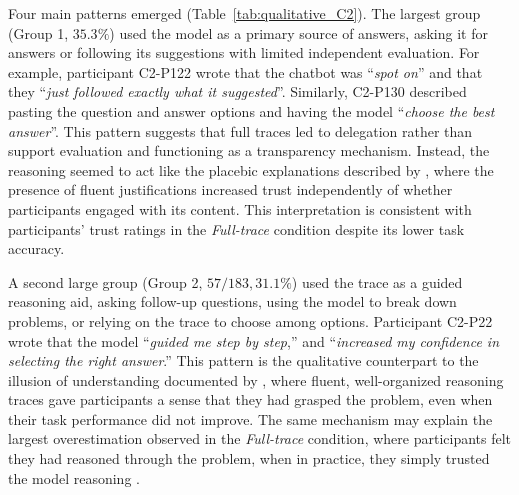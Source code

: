 \documentclass[acmlarge,review=true, anonymous=true]{acmart}
\begin{document}
Four main patterns emerged (Table~\ref{tab:qualitative_C2}). The largest group (Group 1, $35.3\%$) used the model as a primary source of answers, asking it for answers or following its suggestions with limited independent evaluation. For example, participant C2-P122 wrote that the chatbot was ``\textit{spot on}'' and that they ``\textit{just followed exactly what it suggested}''. Similarly, C2-P130 described pasting the question and answer options and having the model ``\textit{choose the best answer}''. This pattern suggests that full traces led to delegation rather than support evaluation and functioning as a transparency mechanism. Instead, the reasoning seemed to act like the placebic explanations described by \citet{eiband2019impact}, where the presence of fluent justifications increased trust independently of whether participants engaged with its content. This interpretation is consistent with participants' trust ratings in the \textit{Full-trace} condition despite its lower task accuracy.


A second large group (Group 2, $57/183, 31.1\%$) used the trace as a guided reasoning aid, asking follow-up questions, using the model to break down problems, or relying on the trace to choose among options. Participant C2-P22 wrote that the model ``\textit{guided me step by step},'' and ``\textit{increased my confidence in selecting the right answer}.''
This pattern is the qualitative counterpart to the illusion of understanding documented by \citet{fisher2021harder}, where fluent, well-organized reasoning traces gave participants a sense that they had grasped the problem, even when their task performance did not improve. The same mechanism may explain the largest overestimation observed in the \textit{Full-trace} condition, where participants felt they had reasoned through the problem, when in practice, they simply trusted the model reasoning \cite{johnson_source_1993}.
\end{document}
